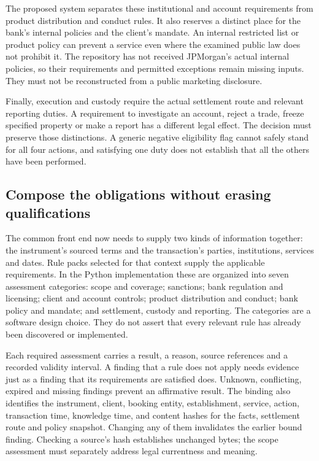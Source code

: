 The proposed system separates these institutional and account requirements from
product distribution and conduct rules. It also reserves a distinct place for
the bank's internal policies and the client's mandate. An internal restricted
list or product policy can prevent a service even where the examined public law
does not prohibit it. The repository has not received JPMorgan's actual internal
policies, so their requirements and permitted exceptions remain missing inputs.
They must not be reconstructed from a public marketing disclosure.

Finally, execution and custody require the actual settlement route and relevant
reporting duties. A requirement to investigate an account, reject a trade,
freeze specified property or make a report has a different legal effect. The
decision must preserve those distinctions. A generic negative eligibility flag
cannot safely stand for all four actions, and satisfying one duty does not
establish that all the others have been performed.

\subsection{Compose the obligations without erasing qualifications}

The common front end now needs to supply two kinds of information together:
the instrument's sourced terms and the transaction's parties, institutions,
services and dates. Rule packs selected for that context supply the applicable
requirements. In the Python implementation these are organized into seven
assessment categories: scope and coverage; sanctions; bank regulation and
licensing; client and account controls; product distribution and conduct; bank
policy and mandate; and settlement, custody and reporting. The categories are
a software design choice. They do not assert that every relevant rule has
already been discovered or implemented.

Each required assessment carries a result, a reason, source references and a
recorded validity interval. A finding that a rule does not apply needs evidence
just as a finding that its requirements are satisfied does. Unknown, conflicting,
expired and missing findings prevent an affirmative result. The binding also
identifies the instrument, client, booking entity, establishment, service,
action, transaction time, knowledge time, and content hashes for the facts,
settlement route and policy snapshot. Changing any of them invalidates the
earlier bound finding. Checking a source's hash establishes unchanged bytes;
the scope assessment must separately address legal currentness and meaning.

